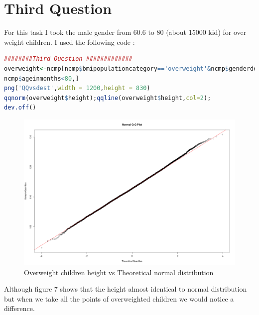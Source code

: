 \documentclass{article}
\begin{document}
	\section*{Third Question}
	For this task I took the male gender from 60.6 to 80 (about 15000 kid) for over weight children. I used the following code :
	\begin{lstlisting}[language=R]
########Third Question #############
overweight<-ncmp[ncmp$bmipopulationcategory=='overweight'&ncmp$genderdescription=='Male' &ncmp$ageinmonths>60.6 &
ncmp$ageinmonths<80,]
png('QQvsdest',width = 1200,height = 830)
qqnorm(overweight$height);qqline(overweight$height,col=2);
dev.off()
	\end{lstlisting}
\begin{figure}[H]
\includegraphics[scale=0.4]{QQvsdest.png}
\caption{Overweight children height vs Theoretical normal distribution}
\end{figure}
Although figure 7 shows that the height almost identical to normal distribution but when we take all the points of overweighted children we would notice a difference.
\end{document}
